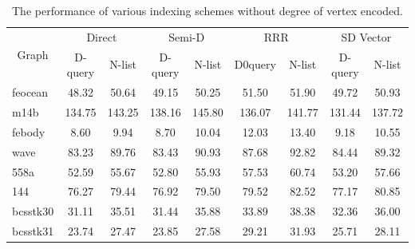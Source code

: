 \documentclass[12pt,glossary]{dalthesis}
\begin{document}
\begin{table}[ht]
\centering
\caption{The performance of various indexing schemes without degree of vertex encoded.}
\label{my-label}
\begin{tabular}{|l||c|c||c|c||c|c||c|c|}
\hline
\multicolumn{1}{|c||}{\multirow{2}{*}{Graph}} & \multicolumn{2}{c||}{Direct} & \multicolumn{2}{c||}{Semi-D} & \multicolumn{2}{c||}{RRR} & \multicolumn{2}{c|}{SD Vector} \\
\cline{2-9}
\multicolumn{1}{|c||}{}                       & D-query      & N-list      & D-query      & N-list      & D0query     & N-list    & D-query        & N-list       \\ \hline
feocean                                    & 48.32        & 50.64       & 49.15        & 50.25       & 51.50       & 51.90     & 49.72          & 50.93        \\
m14b                                       & 134.75       & 143.25      & 138.16       & 145.80      & 136.07      & 141.77    & 131.44         & 137.72       \\
febody                                     & 8.60         & 9.94        & 8.70         & 10.04       & 12.03       & 13.40     & 9.18           & 10.55        \\
wave                                       & 83.23        & 89.76       & 83.43        & 90.93       & 87.68       & 92.82     & 84.44          & 89.32        \\
558a                                       & 52.59        & 55.67       & 52.80        & 55.93       & 57.53       & 60.74     & 53.20          & 57.66        \\
144                                        & 76.27        & 79.44       & 76.92        & 79.50       & 79.52       & 82.52     & 77.17          & 80.85        \\
bcsstk30                                   & 31.11        & 35.51       & 31.44        & 35.88       & 33.89       & 38.38     & 32.36          & 36.00        \\
bcsstk31                                   & 23.74        & 27.47       & 23.85        & 27.58       & 29.21       & 31.93     & 25.71          & 28.11        \\ \hline
\end{tabular}
\end{table}
\end{document}
